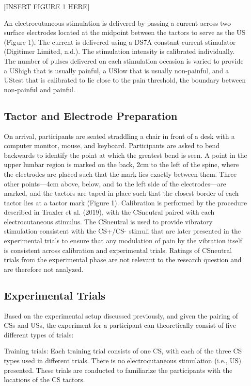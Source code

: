 \documentclass{article}
\begin{document}
[INSERT FIGURE 1 HERE]

An electrocutaneous stimulation is delivered by passing a current across two surface electrodes located at the midpoint between the tactors to serve as the US (Figure 1). The current is delivered using a DS7A constant current stimulator (Digitimer Limited, n.d.). The stimulation intensity is calibrated individually. The number of pulses delivered on each stimulation occasion is varied to provide a UShigh that is usually painful, a USlow that is usually non-painful, and a UStest that is calibrated to lie close to the pain threshold, the boundary between non-painful and painful.

\subsection{Tactor and Electrode Preparation}

On arrival, participants are seated straddling a chair in front of a desk with a computer monitor, mouse, and keyboard. Participants are asked to bend backwards to identify the point at which the greatest bend is seen. A point in the upper lumbar region is marked on the back, 2cm to the left of the spine, where the electrodes are placed such that the mark lies exactly between them. Three other points—4cm above, below, and to the left side of the electrodes—are marked, and the tactors are taped in place such that the closest border of each tactor lies at a tactor mark (Figure 1). Calibration is performed by the procedure described in Traxler et al. (2019), with the CSneutral paired with each electrocutaneous stimulus. The CSneutral is used to provide vibratory stimulation consistent with the CS+/CS- stimuli that are later presented in the experimental trials to ensure that any modulation of pain by the vibration itself is consistent across calibration and experimental trials. Ratings of CSneutral trials from the experimental phase are not relevant to the research question and are therefore not analyzed.

\subsection{Experimental Trials}

Based on the experimental setup discussed previously, and given the pairing of CSs and USs, the experiment for a participant can theoretically consist of five different types of trials:

Training trials: Each training trial consists of one CS, with each of the three CS types used in different trials. There is no electrocutaneous stimulation (i.e., US) presented. These trials are conducted to familiarize the participants with the locations of the CS tactors. 
\end{document}
